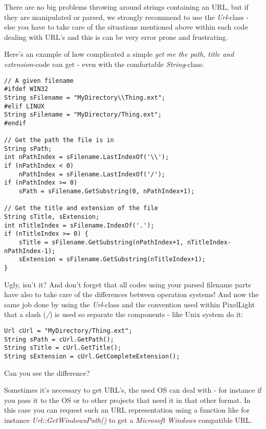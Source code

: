There are no big problems throwing around strings containing an URL, but if they are manipulated or parsed, we strongly recommend to use the \emph{Url}-class - else you have to take care of the situations mentioned above within each code dealing with URL's and this is can be very error prone and frustrating.

Here's an example of how complicated a simple \emph{get me the path, title and extension}-code can get - even with the comfortable \emph{String}-class:

\begin{lstlisting}[caption=File path\, title and extension without using the Url-class]
// A given filename
#ifdef WIN32
String sFilename = "MyDirectory\\Thing.ext";
#elif LINUX
String sFilename = "MyDirectory/Thing.ext";
#endif

// Get the path the file is in
String sPath;
int nPathIndex = sFilename.LastIndexOf('\\');
if (nPathIndex < 0)
	nPathIndex = sFilename.LastIndexOf('/');
if (nPathIndex >= 0)
	sPath = sFilename.GetSubstring(0, nPathIndex+1);

// Get the title and extension of the file
String sTitle, sExtension;
int nTitleIndex = sFilename.IndexOf('.');
if (nTitleIndex >= 0) {
	sTitle = sFilename.GetSubstring(nPathIndex+1, nTitleIndex-nPathIndex-1);
	sExtension = sFilename.GetSubstring(nTitleIndex+1);
}
\end{lstlisting}

Ugly, isn't it? And don't forget that all codes using your parsed filename parts have also to take care of the differences between operation systems! And now the same job done by using the \emph{Url}-class and the convention used within PixelLight that a slash (\emph{/}) is used so separate the components - like Unix system do it:

\begin{lstlisting}[caption=File path\, title and extension using the Url class]
Url cUrl = "MyDirectory/Thing.ext";
String sPath = cUrl.GetPath();
String sTitle = cUrl.GetTitle();
String sExtension = cUrl.GetCompleteExtension();
\end{lstlisting}

Can you see the difference?

Sometimes it's necessary to get URL's, the used OS can deal with - for instance if you pass it to the OS or to other projects that need it in that other format. In this case you can request such an URL representation using a function like for instance \emph{Url::GetWindowsPath()} to get a \emph{Microsoft Windows} compatible URL.

